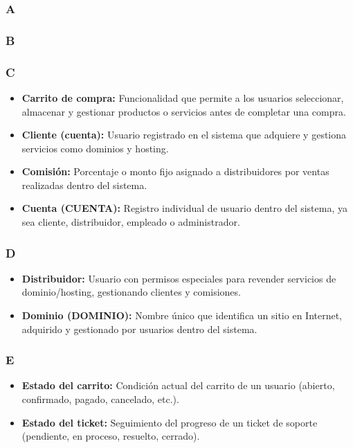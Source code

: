 \subsubsection*{A}

\subsubsection*{B}

\subsubsection*{C}
\begin{itemize}
\item \textbf{Carrito de compra:} Funcionalidad que permite a los usuarios seleccionar, almacenar y gestionar productos o servicios antes de completar una compra.

\item \textbf{Cliente (cuenta):} Usuario registrado en el sistema que adquiere y gestiona servicios como dominios y hosting.

\item \textbf{Comisión:} Porcentaje o monto fijo asignado a distribuidores por ventas realizadas dentro del sistema.

\item \textbf{Cuenta (CUENTA):} Registro individual de usuario dentro del sistema, ya sea cliente, distribuidor, empleado o administrador.
\end{itemize}

\subsubsection*{D}
\begin{itemize}
    \item \textbf{Distribuidor:} Usuario con permisos especiales para revender servicios de dominio/hosting, gestionando clientes y comisiones.
    \item \textbf{Dominio (DOMINIO):} Nombre único que identifica un sitio en Internet, adquirido y gestionado por usuarios dentro del sistema.
\end{itemize}

\subsubsection*{E}
\begin{itemize}
    \item \textbf{Estado del carrito:} Condición actual del carrito de un usuario (abierto, confirmado, pagado, cancelado, etc.).
    \item \textbf{Estado del ticket:} Seguimiento del progreso de un ticket de soporte (pendiente, en proceso, resuelto, cerrado).

\end{itemize}

